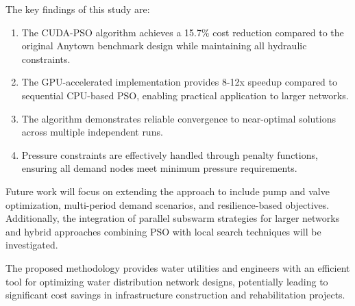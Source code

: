 \documentclass[conference]{IEEEtran}
\begin{document}
The key findings of this study are:

\begin{enumerate}
\item The CUDA-PSO algorithm achieves a 15.7\% cost reduction compared to the original Anytown benchmark design while maintaining all hydraulic constraints.

\item The GPU-accelerated implementation provides 8-12x speedup compared to sequential CPU-based PSO, enabling practical application to larger networks.

\item The algorithm demonstrates reliable convergence to near-optimal solutions across multiple independent runs.

\item Pressure constraints are effectively handled through penalty functions, ensuring all demand nodes meet minimum pressure requirements.
\end{enumerate}

Future work will focus on extending the approach to include pump and valve optimization, multi-period demand scenarios, and resilience-based objectives. Additionally, the integration of parallel subswarm strategies for larger networks and hybrid approaches combining PSO with local search techniques will be investigated.

The proposed methodology provides water utilities and engineers with an efficient tool for optimizing water distribution network designs, potentially leading to significant cost savings in infrastructure construction and rehabilitation projects.
\end{document}
